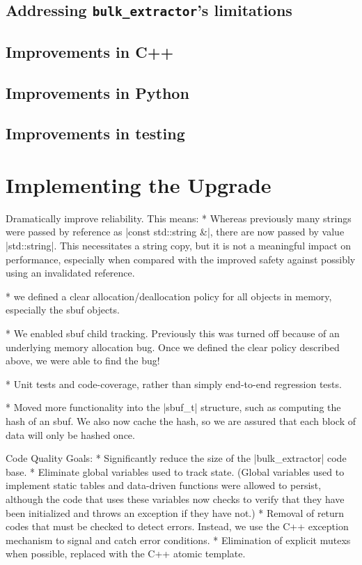 \documentclass[5p]{elsarticle}
\newcommand{\be}{\texttt{bulk\_extractor}\xspace}
\begin{document}
\subsection{Addressing \be's limitations}
\subsection{Improvements in C++}
\subsection{Improvements in Python}
\subsection{Improvements in testing}

\section{Implementing the Upgrade}

Dramatically improve reliability. This means:
* Whereas previously many strings were passed by reference as |const std::string &|,
there are now passed by value |std::string|. This necessitates a
string copy, but it is not a meaningful impact on performance,
especially when compared with the improved safety against possibly
using an invalidated reference.

* we defined a clear allocation/deallocation policy for all
objects in memory, especially the sbuf objects.

* We enabled sbuf child tracking. Previously this was turned off
because of an underlying memory allocation bug. Once we defined the
clear policy described above, we were able to find the bug!

* Unit tests and code-coverage, rather than simply end-to-end
regression tests.

* Moved more functionality into the |sbuf_t| structure, such as
computing the hash of an sbuf. We also now cache the hash, so we are
assured that each block of data will only be hashed once.


Code Quality Goals:
* Significantly reduce the size of the |bulk_extractor| code base.
* Eliminate global variables used to track state. (Global variables
used to implement static tables and data-driven functions were allowed
to persist, although the code that uses these variables now checks to
verify that they have been initialized and throws an exception if they
have not.)
* Removal of return codes that must be checked to detect
errors. Instead, we use the C++ exception mechanism to signal and
catch error conditions.
* Elimination of explicit mutexs when possible, replaced with the C++
atomic template.
\end{document}
